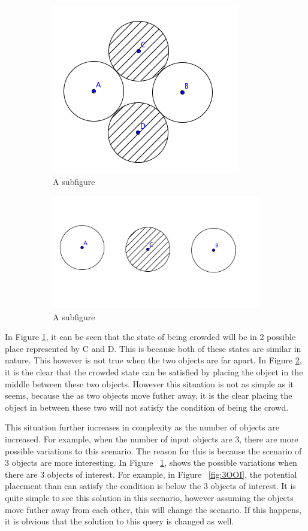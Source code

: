\documentclass[a4paper,11pt]{article}
\begin{document}
\begin{figure}[h]
\centering
\begin{subfigure}{.4\textwidth}
  \centering
  \includegraphics[width=.4\linewidth]{2OOICloseSolution}
  \caption{A subfigure}
  \label{fig:2OOICloseSolution}
\end{subfigure}%
\begin{subfigure}{.4\textwidth}
  \centering
  \includegraphics[width=.4\linewidth]{2OOIFarSolution}
  \caption{A subfigure}
  \label{fig:2OOIFarSolution}
\end{subfigure}
\caption{}
\label{fig:Condition}
\end{figure}

In Figure \ref{fig:2OOICloseSolution}, it can be seen that the state of being crowded will be in 2 possible place represented by C and D. This is because both of these states are similar in nature. This however is not true when the two objects are far apart. In Figure \ref{fig:2OOIFarSolution}, it is the clear that the crowded state can be satisfied by placing the object in the middle between these two objects. However this situation is not as simple as it seems, because the as two objects move futher away, it is the clear placing the object in between these two will not satisfy the condition of being the crowd. 

This situation further increases in complexity as the number of objects are increased. For example, when the number of input objects are 3, there are more possible variations to this scenario. The reason for this is because the scenario of 3 objects are more interesting. In Figure ~\ref{fig:2OOICloseSolution}, shows the possible variations when there are 3 objects of interest. For example, in Figure ~\ref{fig:3OOI}, the potential placement than can satisfy the condition is below the 3 objects of interest. It is quite simple to see this solution in this scenario, however assuming the objects move futher away from each other, this will change the scenario. If this happens, it is obvious that the solution to this query is changed as well. 
\end{document}
